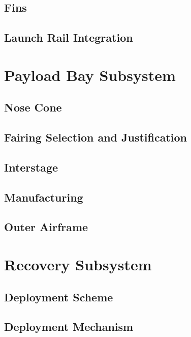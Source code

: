     \subsection{Fins}


    \subsection{Launch Rail Integration}
    

\section{Payload Bay Subsystem}

    \subsection{Nose Cone}
    

    \subsection{Fairing Selection and Justification}
    

    \subsection{Interstage}
    

    \subsection{Manufacturing}
    

    \subsection{Outer Airframe}
    

\section{Recovery Subsystem}

    \subsection{Deployment Scheme}
    

    \subsection{Deployment Mechanism}
    

